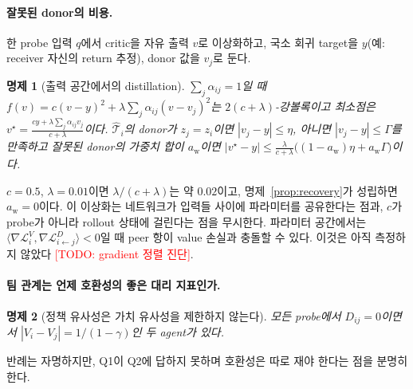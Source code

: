 \documentclass[twocolumn,10pt]{article}
\newtheorem{proposition}{명제}
\theoremstyle{remark}
\newcommand{\todo}[1]{\textcolor{red}{[TODO: #1]}}
\begin{document}
\paragraph{잘못된 donor의 비용.} 한 probe 입력 $q$에서 critic을 자유 출력 $v$로 이상화하고, 국소 회귀 target을 $y$(예: receiver
자신의 return 추정), donor 값을 $v_j$로 둔다.
\begin{proposition}[출력 공간에서의 distillation]
\label{prop:bias}
$\sum_j\alpha_{ij}=1$일 때 $f(v)=c(v-y)^2+\lambda\sum_j\alpha_{ij}(v-v_j)^2$는 $2(c+\lambda)$-강볼록이고 최소점은
$v^\star=\frac{cy+\lambda\sum_j\alpha_{ij}v_j}{c+\lambda}$이다. $\hat{\mathcal{T}}_i$의 donor가 $z_j=z_i$이면 $|v_j-y|\le\eta$,
아니면 $|v_j-y|\le\Gamma$를 만족하고 잘못된 donor의 가중치 합이 $a_{\mathrm{w}}$이면
$|v^\star-y|\le\frac{\lambda}{c+\lambda}\big((1-a_{\mathrm{w}})\eta+a_{\mathrm{w}}\Gamma\big)$이다.
\end{proposition}
$c=0.5$, $\lambda=0.01$이면 $\lambda/(c+\lambda)$는 약 $0.02$이고, 명제~\ref{prop:recovery}가 성립하면 $a_{\mathrm{w}}=0$이다. 이
이상화는 네트워크가 입력들 사이에 파라미터를 공유한다는 점과, $c$가 probe가 아니라 rollout 상태에 걸린다는 점을 무시한다.
파라미터 공간에서는 $\langle\nabla\mathcal{L}^V_i,\nabla\mathcal{L}^D_{i\leftarrow j}\rangle<0$일 때 peer 항이 value 손실과 충돌할 수
있다. 이것은 아직 측정하지 않았다 \todo{gradient 정렬 진단}.

\paragraph{팀 관계는 언제 호환성의 좋은 대리 지표인가.}
\begin{proposition}[정책 유사성은 가치 유사성을 제한하지 않는다]
\label{prop:counter}
모든 probe에서 $D_{ij}=0$이면서 $|V_i-V_j|=1/(1-\gamma)$인 두 agent가 있다.
\end{proposition}
반례는 자명하지만, Q1이 Q2에 답하지 못하며 호환성은 따로 재야 한다는 점을 분명히 한다.
\end{document}

